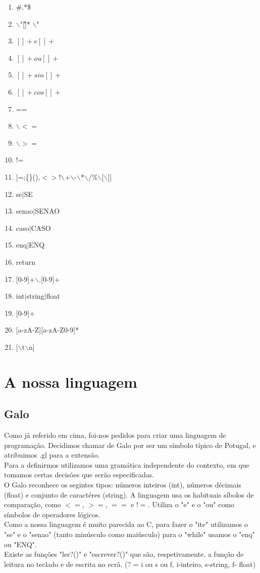 \documentclass{report}
\begin{document}
\begin{enumerate}
	\item \#.*\$  
	\item $\backslash$"[\^\"]* $\backslash$"
	\item $[ ]+e[ ]+$
	\item $[ ]+ou[ ]+$
	\item $[ ]+sin[ ]+$
	\item $[ ]+cos[ ]+$
	\item ==
	\item $\backslash$$<=$
	\item $\backslash$$>=$
	\item !=
	\item $[$=;\{\}(),$<>$!$\backslash$+$\backslash$-$\backslash$*$\backslash$/\%$\backslash$[$\backslash$]]
	\item se$|$SE
	\item senao$|$SENAO 
	\item caso$|$CASO
	\item enq$|$ENQ
	\item return
	\item $[$0-9]+$\backslash$.[0-9]+ 
	\item int$|$string$|$float 
	\item$[$0-9]+
	\item $[$a-zA-Z][a-zA-Z0-9]*
	\item $[$$\backslash$t$\backslash$n] 
	
\end{enumerate}

\section{A nossa linguagem}
\subsection{Galo}
\indent
Como já referido em cima, foi-nos pedidos para criar uma linguagem de programação. Decidimos chamar de Galo por ser um símbolo típico de Potugal, e atribuimos .gl para a extensão.\\
\indent
Para a definirmos utilizamos uma gramática independente do contexto, em que tomamos certas decisões que serão especificadas.\\
\indent
O Galo reconhece os segintes tipos: números inteiros (int), números décimais  (float) e conjunto de caractéres (string). A linguagem usa os habituais síbolos de comparação, como $<=$, $>=$, $==$ e $!=$. Utiliza o "e" e o "ou" como símbolos de operadores lógicos.\\
\indent
Como a nossa linguagem é muito parecida ao C, para fazer o "ite" utilizamos o "se" e o "senao" (tanto minúsculo como maiúsculo) para o "while" usamos o "enq" ou "ENQ".\\
\indent
Existe as funções "ler?()" e "escrever?()" que são, respetivamente, a função de leitura no teclado e de escrita no ecrã. (? = i ou s ou f, i-inteiro, s-string, f- float) \\
\end{document}
